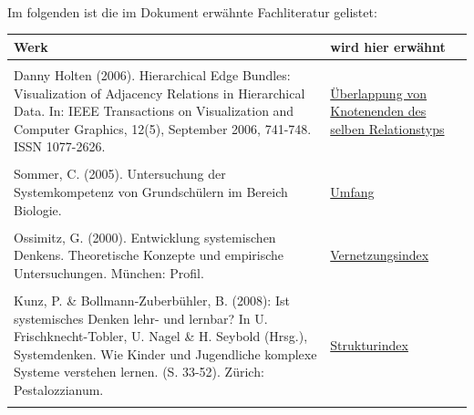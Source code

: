 \documentclass[enabledeprecatedfontcommands,fontsize=11pt,paper=a4,twoside]{scrartcl}
\begin{document}
\\ \\ \\
Im folgenden ist die im Dokument erwähnte Fachliteratur gelistet: \\
\begin{tabular}{p{11cm}p{5cm}}
	Werk & wird hier erwähnt \\ \hline \\
	Danny Holten (2006). Hierarchical Edge Bundles: Visualization of Adjacency Relations in Hierarchical Data. In: IEEE Transactions on Visualization and Computer Graphics, 12(5), September 2006, 741-748. ISSN 1077-2626. & \hyperlink{cc}{Überlappung von Knotenenden des selben Relationstyps} \\ \\ 
	Sommer, C. (2005). Untersuchung der Systemkompetenz von Grundschülern im Bereich Biologie.& \hyperlink{Umfang}{Umfang} \\ \\
	Ossimitz, G. (2000). Entwicklung systemischen Denkens. Theoretische Konzepte und empirische Untersuchungen. München: Profil. & \hyperlink{Vernetzungsindex}{Vernetzungsindex} \\ \\
	Kunz, P. \& Bollmann-Zuberbühler, B. (2008): Ist systemisches Denken lehr- und lernbar? In U. Frischknecht-Tobler, U. Nagel \& H. Seybold (Hrsg.), Systemdenken. Wie Kinder und Jugendliche komplexe Systeme verstehen lernen. (S. 33-52). Zürich: Pestalozzianum. & \hyperlink{Strukturindex}{Strukturindex} \\ \\
\end{tabular}




\newpage
\end{document}
